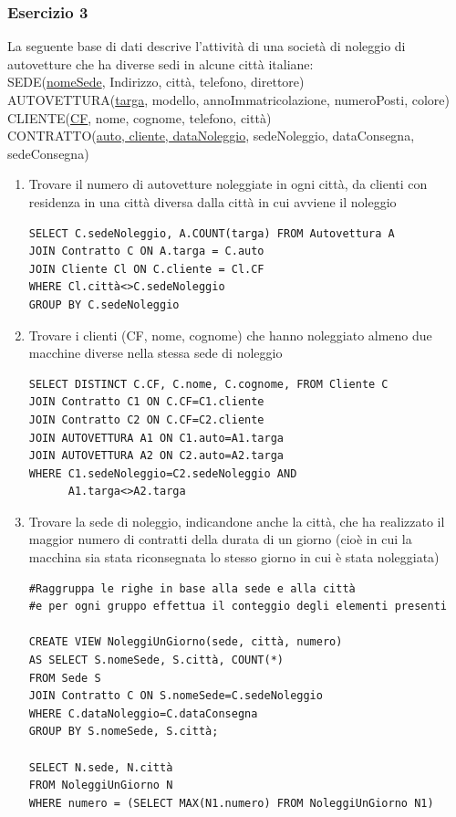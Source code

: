 \documentclass[a4paper]{article}
\begin{document}
\subsubsection{Esercizio 3}
La seguente base di dati descrive l'attività di una società di noleggio di autovetture che ha diverse sedi in alcune città italiane:\medskip\\
SEDE(\underline{nomeSede}, Indirizzo, città, telefono, direttore)\\
AUTOVETTURA(\underline{targa}, modello, annoImmatricolazione, numeroPosti, colore)\\
CLIENTE(\underline{CF}, nome, cognome, telefono, città)\\
CONTRATTO(\underline{auto, cliente, dataNoleggio}, sedeNoleggio, dataConsegna, sedeConsegna)
%
\begin{enumerate}[leftmargin=*]
\item Trovare il numero di autovetture noleggiate in ogni città, da clienti con residenza in una città diversa dalla città in cui avviene il noleggio
\begin{verbatim}
SELECT C.sedeNoleggio, A.COUNT(targa) FROM Autovettura A
JOIN Contratto C ON A.targa = C.auto
JOIN Cliente Cl ON C.cliente = Cl.CF
WHERE Cl.città<>C.sedeNoleggio
GROUP BY C.sedeNoleggio
\end{verbatim}
\item Trovare i clienti (CF, nome, cognome) che hanno noleggiato almeno due macchine diverse nella stessa sede di noleggio
\begin{verbatim}
SELECT DISTINCT C.CF, C.nome, C.cognome, FROM Cliente C
JOIN Contratto C1 ON C.CF=C1.cliente
JOIN Contratto C2 ON C.CF=C2.cliente
JOIN AUTOVETTURA A1 ON C1.auto=A1.targa
JOIN AUTOVETTURA A2 ON C2.auto=A2.targa
WHERE C1.sedeNoleggio=C2.sedeNoleggio AND
      A1.targa<>A2.targa
\end{verbatim}
\item Trovare la sede di noleggio, indicandone anche la città, che ha realizzato il maggior numero di contratti della durata di un giorno (cioè in cui la macchina sia stata riconsegnata lo stesso giorno in cui è stata noleggiata)
\begin{verbatim}
#Raggruppa le righe in base alla sede e alla città
#e per ogni gruppo effettua il conteggio degli elementi presenti

CREATE VIEW NoleggiUnGiorno(sede, città, numero)
AS SELECT S.nomeSede, S.città, COUNT(*)
FROM Sede S
JOIN Contratto C ON S.nomeSede=C.sedeNoleggio
WHERE C.dataNoleggio=C.dataConsegna
GROUP BY S.nomeSede, S.città;

SELECT N.sede, N.città
FROM NoleggiUnGiorno N
WHERE numero = (SELECT MAX(N1.numero) FROM NoleggiUnGiorno N1)
\end{verbatim}
\end{enumerate}
\end{document}
